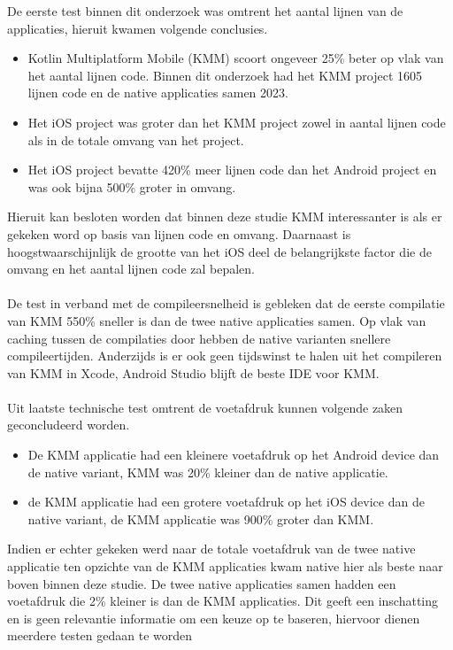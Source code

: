 De eerste test binnen dit onderzoek was omtrent het aantal lijnen van de applicaties, hieruit kwamen volgende conclusies.
\begin{itemize}
    \item Kotlin Multiplatform Mobile (KMM) scoort ongeveer 25\% beter op vlak van het aantal lijnen code. Binnen dit onderzoek had het KMM project 1605 lijnen code en de native applicaties samen 2023.
    \item Het iOS project was groter dan het KMM project zowel in aantal lijnen code als in de totale omvang van het project.
    \item Het iOS project bevatte 420\% meer lijnen code dan het Android project en was ook bijna 500\% groter in omvang.
\end{itemize}
Hieruit kan besloten worden dat binnen deze studie KMM interessanter is als er gekeken word op basis van lijnen code en omvang. Daarnaast is hoogstwaarschijnlijk de grootte van het iOS deel de belangrijkste factor die de omvang en het aantal lijnen code zal bepalen.
\\ \\ 
De test in verband met de compileersnelheid is gebleken dat de eerste compilatie van KMM 550\% sneller is dan de twee native applicaties samen. Op vlak van caching tussen de compilaties door hebben de native varianten snellere compileertijden. Anderzijds is er ook geen tijdswinst te halen uit het compileren van KMM in Xcode, Android Studio blijft de beste IDE voor KMM.
\\ \\ 
Uit laatste technische test omtrent de voetafdruk kunnen volgende zaken geconcludeerd worden.
\begin{itemize}
    \item De KMM applicatie had een kleinere voetafdruk op het Android device dan de native variant, KMM was 20\% kleiner dan de native applicatie.
    \item de KMM applicatie had een grotere voetafdruk op het iOS device dan de native variant, de KMM applicatie was 900\% groter dan KMM.
\end{itemize}
Indien er echter gekeken werd naar de totale voetafdruk van de twee native applicatie ten opzichte van de KMM applicaties kwam native hier als beste naar boven binnen deze studie. De twee native applicaties samen hadden een voetafdruk die 2\% kleiner is dan de KMM applicaties. Dit geeft een inschatting en is geen relevantie informatie om een keuze op te baseren, hiervoor dienen meerdere testen gedaan te worden 
